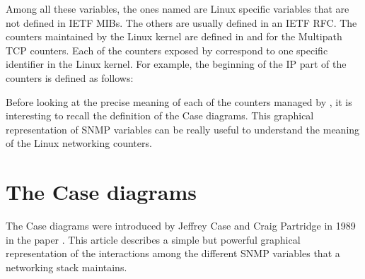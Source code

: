 \documentclass[letterpaper,10pt,english]{sphinxmanual}
\begin{document}
\sphinxAtStartPar
Among all these variables, the ones named  are Linux specific
variables that are not defined in IETF MIBs. The others are usually defined
in an IETF RFC. The counters maintained by the Linux kernel are defined in
 and
 for the Multipath TCP counters.
Each of the counters exposed by  correspond to one specific identifier
in the Linux kernel. For example, the beginning of the IP part of the
counters is defined as follows:

\begin{sphinxVerbatim}[commandchars=\\\{\}]
\end{sphinxVerbatim}

\sphinxAtStartPar
Before looking at the precise meaning of each of the counters managed by
,
it is interesting to recall the definition of the Case diagrams. This graphical
representation of SNMP variables can be really useful to understand the
meaning of the Linux networking counters.


\chapter{The Case diagrams}
\label{\detokenize{nstat-intro:the-case-diagrams}}
\sphinxAtStartPar
The Case diagrams were introduced by Jeffrey Case and Craig
Partridge in 1989 in the paper .
This article describes a simple but powerful graphical representation
of the interactions among the different SNMP variables that a networking
stack maintains.
\end{document}
